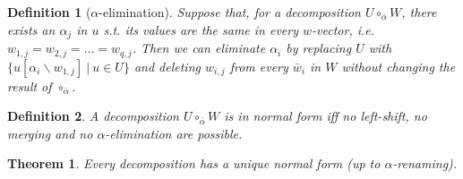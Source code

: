 \documentclass[a4paper, 11pt]{report}
\newtheorem{theorem}{Theorem}
\newtheorem{definition}{Definition}
\begin{document}
\begin{definition}[$\alpha$-elimination]
  Suppose that, for a decomposition $U \circ_{\bar{\alpha}} W$, there exists an $\alpha_j$ in $u$ s.t.
  its values are the same in every $w$-vector, i.e. $w_{1,j} = w_{2,j} = \dots = w_{q,j}$.
  Then we can eliminate $\alpha_i$ by replacing $U$ with $\{u[\alpha_i\backslash w_{1,j}]\ |\ u \in U\}$ and deleting $w_{i,j}$
  from every $\bar{w}_i$ in $W$ without changing the result of $\circ_{\bar{\alpha}}$.
\end{definition}

\begin{definition} A decomposition $U \circ_{\bar{\alpha}} W$ is in normal form iff no left-shift,
no merging and no $\alpha$-elimination are possible.
\end{definition}

\begin{theorem}Every decomposition has a unique normal form (up to $\alpha$-renaming). \label{thm:uniqueNormalForm}\end{theorem}
\end{document}
